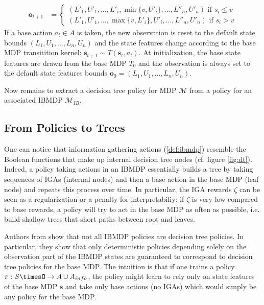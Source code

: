 \begin{definition}
\begin{itemize}
\begin{align*}
    \boldsymbol{o}_{t+1} &= \begin{cases}
        (L'_1, U'_1, \dots , L'_i, \min\{v, U'_i\}, \dots , L''_n, U'_n) \text{ if } s_i \leq v\\
        (L'_1, U'_1, \dots , \max\{v, L'_i\}, U'_i, \dots , L''_n, U'_n) \text{ if } s_i > v
    \end{cases}
\end{align*}
If a base action $a_t\in A$ is taken, the new observation is reset to the default state bounds $(L_1, U_1,\dots, L_n, U_n)$ and the state features change according to the base MDP transitition kernel: $\boldsymbol{s}_{t+1}\sim T(\boldsymbol{s}_t, a_t)$.
At initialization, the base state features are drawn from the base MDP $T_0$ and the observation is always set to the default state features bounds $\boldsymbol{o}_0=(L_1, U_1,\dots, L_n, U_n)$.
\end{itemize}
\end{definition}

Now remains to extract a decision tree policy for MDP $\mathcal{M}$ from a policy for an associated IBMDP $\mathcal{M}_{IB}$. 

\subsection{From Policies to Trees}

One can notice that information gathering actions (\ref{def:ibmdp}) resemble the Boolean functions that make up internal decision tree nodes (cf. figure \ref{fig:dt}).
Indeed, a policy taking actions in an IBMDP essentially builds a tree by taking sequences of IGAs (internal nodes) and then a base action in the base MDP (leaf node) and repeats this process over time.
In particular, the IGA rewards $\zeta$ can be seen as a regularization or a penalty for interpretabiliy: if $\zeta$ is very low compared to base rewards, a policy will try to act in the base MDP as often as possible, i.e. build shallow trees that short paths between root and leaves.

Authors from \cite{topin2021iterative} show that not all IBMDP policies are decision tree policies.
In particular, they show that only deterministic policies depending solely on the observation part of the IBMDP states are guaranteed to correspond to decision tree policies for the base MDP.
The intuition is that if one trains a policy $\pi:S\timesO\rightarrow A\cup A_{info}$, the policy might learn to rely only on state features of the base MDP $\boldsymbol{s}$ and take only base actions (no IGAs) which would simply be any policy for the base MDP.

